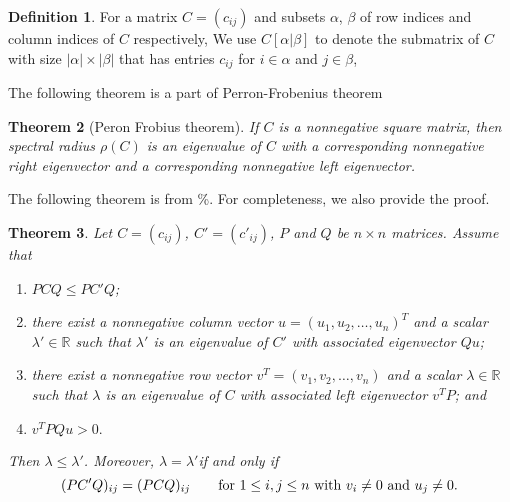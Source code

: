 \documentclass[12pt]{report}%
\theoremstyle{plain}
\newtheorem{thm}{Theorem}[section]
\theoremstyle{definition}
\newtheorem{defn}[thm]{Definition}
\begin{document}
\begin{defn}
    For a matrix $C=(c_{ij})$ and subsets $\alpha$, $\beta$ of row indices and column
    indices of $C$ respectively,  We use $C[\alpha|\beta]$ to denote the submatrix of $C$ with
    size $ |\alpha| \times |\beta| $ that has entries $c_{ij}$ for $i\in \alpha$
    and $j\in\beta$,
\end{defn}
The following theorem is a part of Perron-Frobenius theorem %
\begin{comment}
$C[\alpha|\beta):=C[\alpha|\overline{\beta}],$ where $\overline{\beta}$ is the complement of $\beta$ in the set of column indices, and
similarly, for the definitions of $C(\alpha|\beta]$ and $C(\alpha|\beta).$
 For $\ell\in \mathbb{N},$ $[\ell]:=\{1, 2, \ldots, \ell\},$ symbol $-$ is the complete set of indices, and we use  $i$ to denote the singleton subset $\{i\}$ to reduce the double use of parentheses. For example of the $n\times n$ matrix $C$,
 $C[-|n)=C[[n]|[n-1]]$ is the $n\times (n-1)$ submatrix of $C$ obtained by deleting the last column of $C$.

    The bracket [] and parentheses () can be used together is the notation of sub-matrix, such as $C[k|e)$ or $C(k|e]$.
\end{comment}


\begin{thm}[Peron Frobius theorem]
        If $C$ is a nonnegative square matrix, then spectral radius $\rho(C)$ is an eigenvalue
         of $C$ with a corresponding nonnegative right eigenvector and a corresponding nonnegative
          left eigenvector.
\end{thm}


The following theorem is from \%. For completeness, we also provide the proof.  %

\begin{thm}\label{pre_thm}
    Let $C=(c_{ij})$, $C'=(c'_{ij})$, $P$ and $Q$ be  $n\times n$ matrices.
Assume that
\begin{enumerate}[label=(\roman*)]
    \item \label{pre_thm_em1}  $PCQ\leq PC'Q$;   %
    \item \label{pre_thm_em2}  there exist a nonnegative column vector $u=(u_1, u_2, \ldots, u_n)^T$  and a
    scalar $\lambda'\in \mathbb{R}$ such that $\lambda'$ is an eigenvalue of $C'$ with
    associated eigenvector $Qu$;
    \item \label{pre_thm_em3}  there exist a nonnegative row vector $v^T=(v_1, v_2, \ldots, v_n)$  and a scalar
    $\lambda\in \mathbb{R}$such that $\lambda$ is an eigenvalue of $C$ with associated  left
    eigenvector $v^TP$; and
    \item \label{pre_thm_em4} $v^TPQu>0.$
\end{enumerate}
    Then $\lambda\leq \lambda'$. Moreover, $\lambda=\lambda'$if and only if
    \begin{equation}\label{pre0}
        (PC'Q)_{ij}=(PCQ)_{ij}\qquad \hbox{for~}1\leq i, j\leq n \hbox{~with~} v_i\ne 0 \hbox{~and~} u_j\ne 0.
    \end{equation}
\end{thm}
\end{document}
